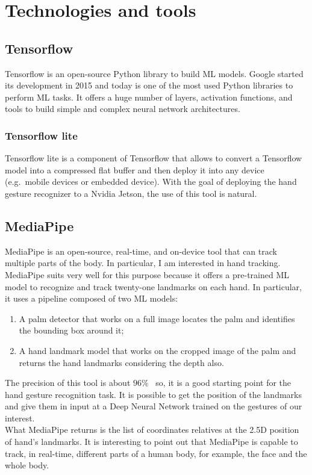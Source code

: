 \documentclass[../thesis.tex]{subfiles}
\begin{document}
\chapter{Technologies and tools}\label{cap:technologies-and-tools}

\section{Tensorflow}
Tensorflow is an open-source Python library to build \acrshort{ML} models. Google started its development in 2015 and today is one of the most used Python libraries to perform \acrshort{ML} tasks. It offers a huge number of layers, activation functions, and tools to build simple and complex neural network architectures.

\subsection{Tensorflow lite}
Tensorflow lite is a component of Tensorflow that allows to convert a Tensorflow model into a compressed flat buffer and then deploy it into any device (e.g.\ mobile devices or embedded device). With the goal of deploying the hand gesture recognizer to a Nvidia Jetson, the use of this tool is natural.

\section{MediaPipe}\label{sec:mediapipe}
MediaPipe is an open-source, real-time, and on-device tool that can track multiple parts of the body. In particular, I am interested in hand tracking. MediaPipe suits very well for this purpose because it offers a pre-trained \acrshort{ML} model to recognize and track twenty-one landmarks on each hand. In particular, it uses a pipeline composed of two \acrshort{ML} models:
\begin{enumerate}
    \item A palm detector that works on a full image locates the palm and identifies the bounding box around it;
    \item A hand landmark model that works on the cropped image of the palm and returns the hand landmarks considering the depth also. 
\end{enumerate}
The precision of this tool is about $96\%$~\cite{article:mediapipe} so, it is a good starting point for the hand gesture recognition task. It is possible to get the position of the landmarks and give them in input at a Deep Neural Network trained on the gestures of our interest.\\
What MediaPipe returns is the list of coordinates relatives at the 2.5D position of hand's landmarks.
It is interesting to point out that MediaPipe is capable to track, in real-time, different parts of a human body, for example, the face and the whole body.~\cite{site:mediapipe}
\end{document}
